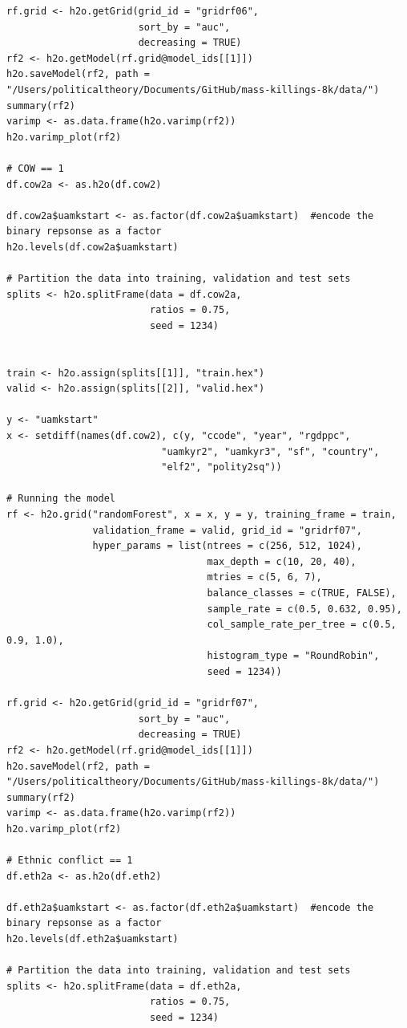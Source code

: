 \begin{verbatim}
rf.grid <- h2o.getGrid(grid_id = "gridrf06",
                       sort_by = "auc",
                       decreasing = TRUE)
rf2 <- h2o.getModel(rf.grid@model_ids[[1]])
h2o.saveModel(rf2, path = "/Users/politicaltheory/Documents/GitHub/mass-killings-8k/data/")
summary(rf2)
varimp <- as.data.frame(h2o.varimp(rf2))
h2o.varimp_plot(rf2)

# COW == 1
df.cow2a <- as.h2o(df.cow2)

df.cow2a$uamkstart <- as.factor(df.cow2a$uamkstart)  #encode the binary repsonse as a factor
h2o.levels(df.cow2a$uamkstart)

# Partition the data into training, validation and test sets
splits <- h2o.splitFrame(data = df.cow2a, 
                         ratios = 0.75,  
                         seed = 1234)  


train <- h2o.assign(splits[[1]], "train.hex")   
valid <- h2o.assign(splits[[2]], "valid.hex") 

y <- "uamkstart"
x <- setdiff(names(df.cow2), c(y, "ccode", "year", "rgdppc",
                           "uamkyr2", "uamkyr3", "sf", "country",
                           "elf2", "polity2sq")) 

# Running the model
rf <- h2o.grid("randomForest", x = x, y = y, training_frame = train, 
               validation_frame = valid, grid_id = "gridrf07",
               hyper_params = list(ntrees = c(256, 512, 1024),
                                   max_depth = c(10, 20, 40),
                                   mtries = c(5, 6, 7),
                                   balance_classes = c(TRUE, FALSE),
                                   sample_rate = c(0.5, 0.632, 0.95),
                                   col_sample_rate_per_tree = c(0.5, 0.9, 1.0),
                                   histogram_type = "RoundRobin",
                                   seed = 1234)) 

rf.grid <- h2o.getGrid(grid_id = "gridrf07",
                       sort_by = "auc",
                       decreasing = TRUE)
rf2 <- h2o.getModel(rf.grid@model_ids[[1]])
h2o.saveModel(rf2, path = "/Users/politicaltheory/Documents/GitHub/mass-killings-8k/data/")
summary(rf2)
varimp <- as.data.frame(h2o.varimp(rf2))
h2o.varimp_plot(rf2)

# Ethnic conflict == 1
df.eth2a <- as.h2o(df.eth2)

df.eth2a$uamkstart <- as.factor(df.eth2a$uamkstart)  #encode the binary repsonse as a factor
h2o.levels(df.eth2a$uamkstart)

# Partition the data into training, validation and test sets
splits <- h2o.splitFrame(data = df.eth2a, 
                         ratios = 0.75, 
                         seed = 1234) 



\end{verbatim}
